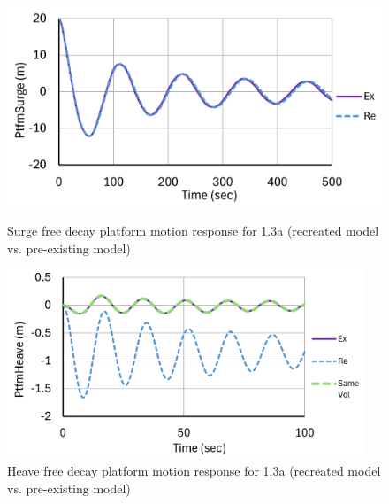 \documentclass[a4paper, 11pt]{article}
\begin{document}
\begin{figure}[H]
    \begin{minipage}{0.47\textwidth}
        \centering
        \includegraphics[width=1\textwidth]{1.3_surge_mine.png}
        \caption{\small Surge free decay platform motion response for 1.3a (recreated model vs. pre-existing model)}
        \label{fig:1.3a_surge_mine_recreated}
    \end{minipage}
    \hfill
    \begin{minipage}{0.49\textwidth}
        \centering
        \includegraphics[width=0.95\textwidth]{1.3a_heave_mine_1.png}
        \caption{\small Heave free decay platform motion response for 1.3a (recreated model vs. pre-existing model)}
        \label{fig:1.3a_heave_mine_recreated}
    \end{minipage}
\end{figure}
\end{document}
